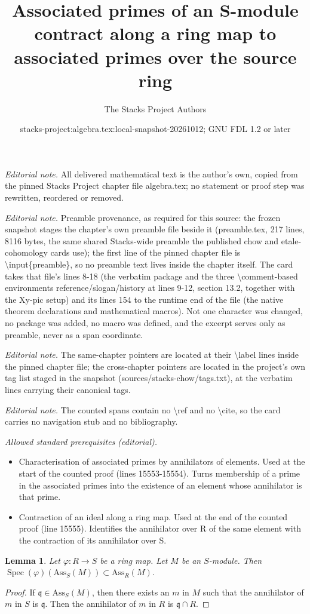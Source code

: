 \documentclass[10pt,a4paper]{amsart}
\title{Associated primes of an S-module contract along a ring map to associated primes over the source ring}
\author{The Stacks Project Authors}
\date{stacks-project:algebra.tex:local-snapshot-20261012; GNU FDL 1.2 or later}
\theoremstyle{plain}
\newtheorem{lemma}[subsection]{Lemma}
\theoremstyle{definition}
\theoremstyle{remark}
\numberwithin{equation}{subsection}
\def\Spec{\mathop{\mathrm{Spec}}}
\begin{document}
\maketitle
\noindent\textit{Editorial note.} All delivered mathematical text is the author's own, copied from the pinned Stacks Project chapter file algebra.tex; no statement or proof step was rewritten, reordered or removed.\par\medskip
\noindent\textit{Editorial note.} Preamble provenance, as required for this source: the frozen snapshot stages the chapter's own preamble file beside it (preamble.tex, 217 lines, 8116 bytes, the same shared Stacks-wide preamble the published chow and etale-cohomology cards use); the first line of the pinned chapter file is \textbackslash{}input\{preamble\}, so no preamble text lives inside the chapter itself. The card takes that file's lines 8-18 (the verbatim package and the three \textbackslash{}comment-based environments reference/slogan/history at lines 9-12, section 13.2, together with the Xy-pic setup) and its lines 154 to the runtime end of the file (the native theorem declarations and mathematical macros). Not one character was changed, no package was added, no macro was defined, and the excerpt serves only as preamble, never as a span coordinate.\par\medskip
\noindent\textit{Editorial note.} The same-chapter pointers are located at their \textbackslash{}label lines inside the pinned chapter file; the cross-chapter pointers are located in the project's own tag list staged in the snapshot (sources/stacks-chow/tags.txt), at the verbatim lines carrying their canonical tags.\par\medskip
\noindent\textit{Editorial note.} The counted spans contain no \textbackslash{}ref and no \textbackslash{}cite, so the card carries no navigation stub and no bibliography.\par\medskip
\noindent\textit{Allowed standard prerequisites (editorial).}\begin{itemize}
\item Characterisation of associated primes by annihilators of elements. Used at the start of the counted proof (lines 15553-15554). Turns membership of a prime in the associated primes into the existence of an element whose annihilator is that prime.
\item Contraction of an ideal along a ring map. Used at the end of the counted proof (line 15555). Identifies the annihilator over R of the same element with the contraction of its annihilator over S.
\end{itemize}\medskip
\begin{lemma}
\label{lemma-ass-functorial}
Let $\varphi : R \to S$ be a ring map.
Let $M$ be an $S$-module.
Then $\Spec(\varphi)(\text{Ass}_S(M)) \subset \text{Ass}_R(M)$.
\end{lemma}

\begin{proof}
If $\mathfrak q \in \text{Ass}_S(M)$, then there exists an $m$ in $M$
such that the annihilator of $m$ in $S$ is $\mathfrak q$. Then the annihilator
of $m$ in $R$ is $\mathfrak q \cap R$.
\end{proof}
\end{document}
